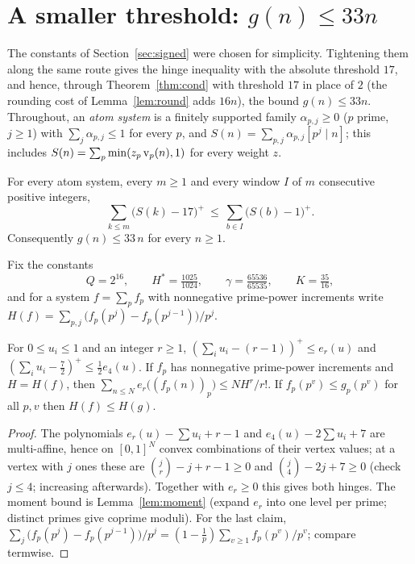 \section{A smaller threshold: $g(n)\le33n$}\label{sec:h17}

The constants of Section~\ref{sec:signed} were chosen for simplicity. Tightening them along the same route gives the
hinge inequality with the absolute threshold $17$, and hence, through Theorem~\ref{thm:cond} with threshold $17$ in place of
$2$ (the rounding cost of Lemma~\ref{lem:round} adds $16n$), the bound $g(n)\le33n$. Throughout, an \emph{atom system} is a
finitely supported family $\alpha_{p,j}\ge0$ ($p$ prime, $j\ge1$) with $\sum_j\alpha_{p,j}\le1$ for every $p$, and
$S(n)=\sum_{p,j}\alpha_{p,j}[p^j\mid n]$; this includes $S(n)=\sum_p\min(z_p\operatorname{v}_p(n),1)$ for every weight $z$.

\begin{theorem}[threshold $17$]\label{thm:h17}
For every atom system, every $m\ge1$ and every window $I$ of $m$ consecutive positive integers,
\[
\sum_{k\le m}\bigl(S(k)-17\bigr)^+\ \le\ \sum_{b\in I}\bigl(S(b)-1\bigr)^+ .
\]
Consequently $g(n)\le33\,n$ for every $n\ge1$.
\end{theorem}

Fix the constants
\[
Q=2^{16},\qquad H^*=\tfrac{1025}{1024},\qquad \gamma=\tfrac{65536}{65535},\qquad K=\tfrac{35}{16},
\]
and for a system $f=\sum_pf_p$ with nonnegative prime-power increments write $H(f)=\sum_{p,j}\bigl(f_p(p^j)-f_p(p^{j-1})\bigr)/p^j$.

\begin{lemma}\label{lem:h17-1}
For $0\le u_i\le1$ and an integer $r\ge1$, $(\sum_iu_i-(r-1))^+\le e_r(u)$ and $(\sum_iu_i-\tfrac72)^+\le\tfrac12e_4(u)$.
If $f_p$ has nonnegative prime-power increments and $H=H(f)$, then $\sum_{n\le N}e_r\bigl((f_p(n))_p\bigr)\le NH^r/r!$.
If $f_p(p^v)\le g_p(p^v)$ for all $p,v$ then $H(f)\le H(g)$.
\end{lemma}
\begin{proof}
The polynomials $e_r(u)-\sum u_i+r-1$ and $e_4(u)-2\sum u_i+7$ are multi-affine, hence on $[0,1]^N$ convex combinations of
their vertex values; at a vertex with $j$ ones these are $\binom jr-j+r-1\ge0$ and $\binom j4-2j+7\ge0$ (check $j\le4$; increasing
afterwards). Together with $e_r\ge0$ this gives both hinges. The moment bound is Lemma~\ref{lem:moment} (expand $e_r$ into one
level per prime; distinct primes give coprime moduli). For the last claim,
$\sum_j\bigl(f_p(p^j)-f_p(p^{j-1})\bigr)/p^j=(1-\tfrac1p)\sum_{v\ge1}f_p(p^v)/p^v$; compare termwise.
\end{proof}

